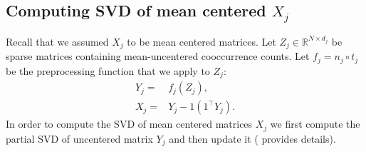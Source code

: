 \documentclass[11pt]{article}
\newcommand{\remove}[1]{}
\begin{document}
\subsection{Computing SVD of mean centered $X_j$}
\label{ssec:svdmc}
Recall that we assumed $X_j$ to be mean centered matrices. Let $Z_j
\in \mathbb{R}^{N \times d_j}$ be sparse matrices containing
mean-uncentered cooccurrence counts. Let $f_j = n_j \circ t_j $ be the preprocessing
function that we apply to $Z_j$: 
\begin{align}
  Y_j =& f_j (Z_j), \\
  X_j =& Y_j - 1 (1^\top Y_j).
\end{align}
In order to compute the SVD of mean centered matrices $X_j$ we first
compute the partial SVD of uncentered 
matrix $Y_j$ and then update it ( provides details).
\remove{We experimented with representations created from the
uncentered matrices $Y_j$ and found that they performed as well as 
the mean centered versions but we would not mention them further since
it is computationally efficient to follow the principled approach. We
note, however, that even the method of mean-centering the SVD
produces an approximation.}
\end{document}
